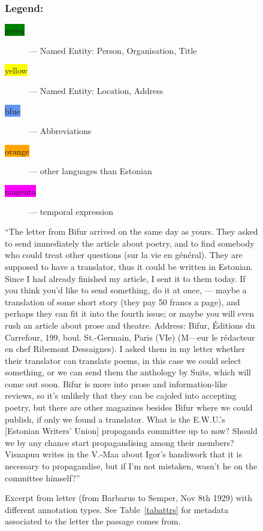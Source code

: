 \documentclass[runningheads]{llncs}
\begin{document}
\begin{figure}
\begin{minipage}{0.9\textwidth}
    \subsubsection{Legend:}
    \begin{description}
\item[\colorbox{Green}{green}] --- Named Entity: Person, Organisation, Title
\item[\colorbox{Yellow}{yellow}] --- Named Entity: Location, Address
\item[\colorbox{CornflowerBlue}{blue}] --- Abbreviations
\item[\colorbox{Orange}{orange}] --- other languages than Estonian
\item[\colorbox{Magenta}{magenta}] --- temporal expression
\end{description}
\end{minipage}
\begin{minipage}{0.9\textwidth}
  \vspace{14pt}
  ``The letter from Bifur arrived on the same day as yours. They asked to send immediately the article about poetry, and to find somebody who could treat other questions (sur la vie en g\'en\'eral). They are supposed to have a translator, thus it could be written in Estonian. Since I had already finished my article, I sent it to them today. If you think you’d like to send something, do it at once, --- maybe a translation of some short story (they pay 50 francs a page), and perhaps they can fit it into the fourth issue; or maybe you will even rush an article about prose and theatre. Address: Bifur, \'Editions du Carrefour, 199, boul. St.-Germain, Paris (VIe) (M---eur le r\'edacteur en chef Ribemont Dessaignes). I asked them in my letter whether their translator can translate poems, in this case we could select something, or we can send them the anthology by Suits, which will come out soon. Bifur is more into prose and information-like reviews, so it's unlikely that they can be cajoled into accepting poetry, but there are other magazines besides Bifur where we could publish, if only we found a translator. What is the E.W.U.'s [Estonian Writers' Union] propaganda committee up to now? Should we by any chance start propagandising among their members? Visnapuu writes in the V.-Maa about Igor's handiwork that it is necessary to propagandise, but if I'm not mistaken, wasn't he on the committee himself?''
  \end{minipage}
  \caption{Excerpt from letter (from Barbarus to Semper, Nov 8th 1929) with different annotation types.  See Table~\ref{tabattrs} for metadata associated to the letter the passage comes from.}\label{fig1}
\end{figure}
\end{document}
